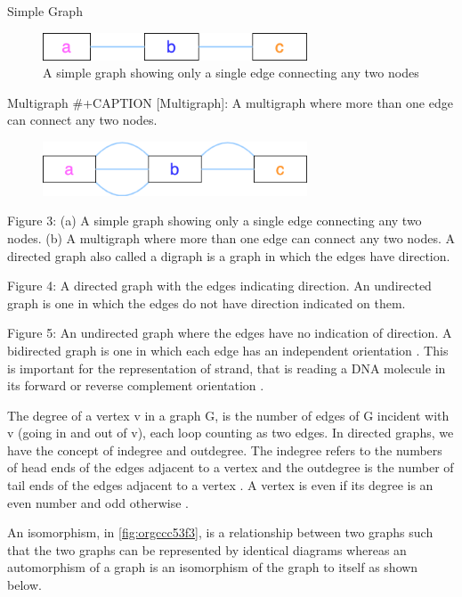 \documentclass[10pt, a4paper]{article}
\begin{document}
Simple Graph
\begin{figure}
\centering
\includegraphics[width=0.7\textwidth]{figures/Graph-classifications-Simple-Graph.png}
\caption[Simple Graph]{\label{fig:org351170e}
A simple graph showing only a single edge connecting any two nodes}
\end{figure}


Multigraph
\#+CAPTION [Multigraph]: A multigraph where more than one edge can connect any two nodes.
\begin{figure}
\centering
\includegraphics[width=0.7\textwidth]{figures/Graph-classifications-Multigraph.png}
\label{org41cc025}
\end{figure}


Figure 3: (a) A simple graph showing only a single edge connecting any two
nodes. (b) A multigraph where more than one edge can connect any two nodes.
A directed graph also called a digraph is a graph in which the edges have
direction.

Figure 4: A directed graph with the edges indicating direction.
An undirected graph is one in which the edges do not have direction indicated on
them.

Figure 5: An undirected graph where the edges have no indication of direction.
A bidirected graph is one in which each edge has an independent orientation
\cite{edmondsMatchingWellSolvedClass2003}.
This is important for the representation of strand, that is reading a DNA
molecule in its forward or reverse complement orientation 
\cite{patenGenomeGraphsEvolution2017}.

The degree of a vertex v in a graph G, is the number of edges of G incident with
v (going in and out of v), each loop counting as two edges. In directed graphs,
we have the concept of indegree and outdegree. The indegree refers to the
numbers of head ends of the edges adjacent to a vertex and the outdegree is the
number of tail ends of the edges adjacent to a vertex \cite{bondyGraphTheory2011}.
A vertex is even if its degree is an even number and odd otherwise
\cite{trudeauIntroductionGraphTheory1993}.

An isomorphism, in \ref{fig:orgccc53f3}, is a relationship between two graphs such that the two graphs
can be represented by identical diagrams \cite{bondyGraphTheory2011} whereas an 
automorphism of a graph is an isomorphism of the graph to itself as shown below.
\end{document}
